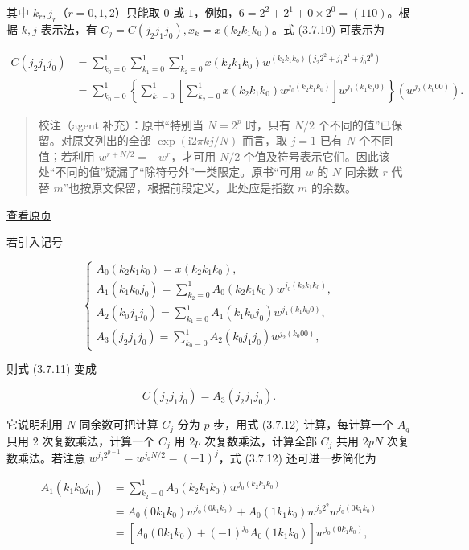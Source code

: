\documentclass[
  10pt,
  fontset=fandol]{ctexart}
\begin{document}
其中 \(k_r,j_r\)（\(r=0,1,2\)）只能取 \(0\) 或 \(1\)，例如，\(6=2^2+2^1+0\times2^0=(110)\)。根据 \(k,j\) 表示法，有 \(C_j=C(j_2j_1j_0),x_k=x(k_2k_1k_0)\)。式 (3.7.10) 可表示为

\[
\begin{aligned}
C(j_2j_1j_0)&=\sum_{k_0=0}^1\sum_{k_1=0}^1\sum_{k_2=0}^1x(k_2k_1k_0)w^{(k_2k_1k_0)(j_2 2^2+j_1 2^1+j_0 2^0)}\\
&=\sum_{k_0=0}^1\left\{\sum_{k_1=0}^1\left[\sum_{k_2=0}^1x(k_2k_1k_0)w^{j_0(k_2k_1k_0)}\right]w^{j_1(k_1k_0 0)}\right\}\left(w^{j_2(k_0 00)}\right).
\end{aligned}\tag{3.7.11}
\]

\begin{quote}
校注（agent 补充）：原书``特别当 \(N=2^p\) 时，只有 \(N/2\) 个不同的值''已保留。对原文列出的全部 \(\exp(\mathrm i2\pi kj/N)\) 而言，取 \(j=1\) 已有 \(N\) 个不同值；若利用 \(w^{r+N/2}=-w^r\)，才可用 \(N/2\) 个值及符号表示它们。因此该处``不同的值''疑漏了``除符号外''一类限定。原书``可用 \(w\) 的 \(N\) 同余数 \(r\) 代替 \(m\)''也按原文保留，根据前段定义，此处应是指数 \(m\) 的余数。
\end{quote}

\href{../../source-images/pdf-088.jpeg}{查看原页}

若引入记号

\[
\begin{cases}
A_0(k_2k_1k_0)=x(k_2k_1k_0),\\[4pt]
A_1(k_1k_0j_0)=\displaystyle\sum_{k_2=0}^1A_0(k_2k_1k_0)w^{j_0(k_2k_1k_0)},\\[4pt]
A_2(k_0j_1j_0)=\displaystyle\sum_{k_1=0}^1A_1(k_1k_0j_0)w^{j_1(k_1k_0 0)},\\[4pt]
A_3(j_2j_1j_0)=\displaystyle\sum_{k_0=0}^1A_2(k_0j_1j_0)w^{j_2(k_0 00)},
\end{cases}\tag{3.7.12}
\]

则式 (3.7.11) 变成

\[
C(j_2j_1j_0)=A_3(j_2j_1j_0).
\]

它说明利用 \(N\) 同余数可把计算 \(C_j\) 分为 \(p\) 步，用式 (3.7.12) 计算，每计算一个 \(A_q\) 只用 \(2\) 次复数乘法，计算一个 \(C_j\) 用 \(2p\) 次复数乘法，计算全部 \(C_j\) 共用 \(2pN\) 次复数乘法。若注意 \(w^{j_0 2^{p-1}}=w^{j_0N/2}=(-1)^j\)，式 (3.7.12) 还可进一步简化为

\[
\begin{aligned}
A_1(k_1k_0j_0)&=\sum_{k_2=0}^1A_0(k_2k_1k_0)w^{j_0(k_2k_1k_0)}\\
&=A_0(0k_1k_0)w^{j_0(0k_1k_0)}+A_0(1k_1k_0)w^{j_0 2^2}w^{j_0(0k_1k_0)}\\
&=[A_0(0k_1k_0)+(-1)^{j_0}A_0(1k_1k_0)]w^{j_0(0k_1k_0)},
\end{aligned}
\]
\end{document}
